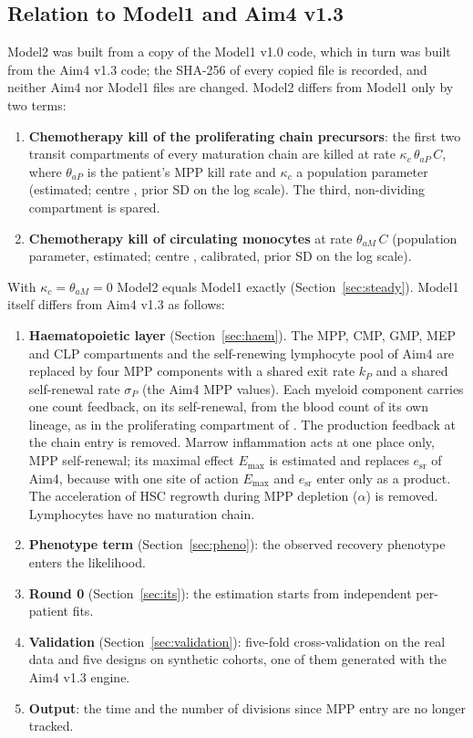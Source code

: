 \documentclass[11pt]{article}
\begin{document}
\subsection{Relation to Model1 and Aim4 v1.3}\label{sec:changes}
Model2 was built from a copy of the Model1 v1.0 code, which in turn was built from the Aim4 v1.3 code; the SHA-256 of every copied file is recorded, and neither Aim4 nor Model1 files are changed. Model2 differs from Model1 only by two terms:
\begin{enumerate}
\item \textbf{Chemotherapy kill of the proliferating chain precursors}: the first two transit compartments of every maturation chain are killed at rate $\kappa_c\,\theta_{aP}\,C$, where $\theta_{aP}$ is the patient's MPP kill rate and $\kappa_c$ a population parameter (estimated; centre \valKappaC, prior SD \valKappaCSd{} on the log scale). The third, non-dividing compartment is spared.
\item \textbf{Chemotherapy kill of circulating monocytes} at rate $\theta_{aM}\,C$ (population parameter, estimated; centre \valThAm, calibrated, prior SD \valThAmSd{} on the log scale).
\end{enumerate}
With $\kappa_c=\theta_{aM}=0$ Model2 equals Model1 exactly (Section~\ref{sec:steady}). Model1 itself differs from Aim4 v1.3 as follows:
\begin{enumerate}
\item \textbf{Haematopoietic layer} (Section~\ref{sec:haem}). The MPP, CMP, GMP, MEP and CLP compartments and the self-renewing lymphocyte pool of Aim4 are replaced by four MPP components with a shared exit rate $k_P$ and a shared self-renewal rate $\sigma_P$ (the Aim4 MPP values). Each myeloid component carries one count feedback, on its self-renewal, from the blood count of its own lineage, as in the proliferating compartment of \citet{friberg2002}. The production feedback at the chain entry is removed. Marrow inflammation acts at one place only, MPP self-renewal; its maximal effect $E_{\max}$ is estimated and replaces $e_{\mathrm{sr}}$ of Aim4, because with one site of action $E_{\max}$ and $e_{\mathrm{sr}}$ enter only as a product. The acceleration of HSC regrowth during MPP depletion ($\alpha$) is removed. Lymphocytes have no maturation chain.
\item \textbf{Phenotype term} (Section~\ref{sec:pheno}): the observed recovery phenotype enters the likelihood.
\item \textbf{Round 0} (Section~\ref{sec:its}): the estimation starts from independent per-patient fits.
\item \textbf{Validation} (Section~\ref{sec:validation}): five-fold cross-validation on the real data and five designs on synthetic cohorts, one of them generated with the Aim4 v1.3 engine.
\item \textbf{Output}: the time and the number of divisions since MPP entry are no longer tracked.
\end{enumerate}
\end{document}
